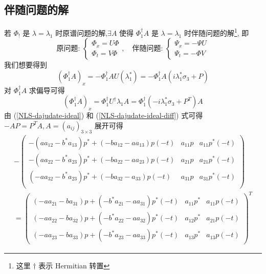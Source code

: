 \subsection{伴随问题的解}
若 $ \Phi_! $ 是 $ \lambda = \lambda_{1} $ 时原谱问题的解,$ \exists A $ 使得 $ \Phi_{1}^{\dagger}A $ 是 $ \lambda = \lambda_1 $ 时伴随问题的解\footnote{这里 $ \dagger $ 表示 Hermitian 转置}, 即
\begin{equation}
    \text{原问题: } \begin{cases}
        \Phi_{x} = U \Phi \\
        \Phi_{t} = V \Phi
    \end{cases}, \quad
    \text{伴随问题: } \begin{cases}
        \Psi_{x} = - \Psi U \\
        \Psi_{t} = - \Phi V
    \end{cases}
\end{equation}
我们想要得到
\begin{equation}\label{NLS-dajudate-ideal}
    (\Phi_{1}^{\dagger} A)_{x} = - \Phi_{1}^{\dagger} AU(\lambda_{1}^{*}) = - \Phi_{1}^{\dagger} A(i \lambda_{1}^{*} \sigma_{3} + P)
\end{equation}
对 $ \Phi_{1}^{\dagger} A $ 求偏导可得
\begin{equation}\label{NLS-dajudate-ideal-diff}
    (\Phi_{1}^{\dagger} A)_{x} = \Phi_{1}^{\dagger} U^{\dagger} \lambda_{1} A = \Phi_{1}^{\dagger}(-i \lambda_{1}^{*} \sigma_{3} + P^{T}) A
\end{equation}
由 (\ref{NLS-dajudate-ideal}) 和 (\ref{NLS-dajudate-ideal-diff}) 式可得 $ -AP = P^{T} A, A = (a_{ij})_{3 \times 3} $ 展开可得
\begin{multline}
    - \begin{pmatrix}
        -(aa_{12} - b^{*}a_13)p^{*} + (-ba_{12} - aa_{13})p(-t) & a_{11}p & a_{11}p^{*}(-t) \\
        -(aa_{22} - b^{*}a_{23})p^{*} + (- ba_{22} - aa_{23})p(-t) & a_{21}p & a_{21}p^{*}(-t) \\
        (-aa_{32} - b^{*}a_{23})p^{*} + (-ba_{32} - a_{33})p(-t) & a_{31}p & a_{31}p^{*}(-t) \\
    \end{pmatrix} \\
    = \begin{pmatrix}
        (-aa_{21} - ba_{31})p + (-b^{*}a_{21} - aa_{31})p^{*}(-t) & a_{11}p^{*} & a_{11}p(-t) \\
        (-aa_{22} - ba_{32})p + (-b^{*}a_{22} - aa_{32})p^{*}(-t) & a_{12}p^{*} & a_{21}p(-t) \\
        (-aa_{23} - ba_{33})p + (-b^{*}a_{23} - aa_{33})p^{*}(-t) & a_{13}p^{*} & a_{13}p(-t)
    \end{pmatrix}^{T}
\end{multline}
